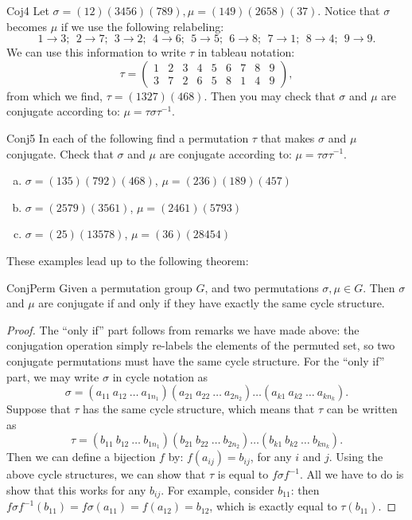 \begin{example}{Coj4}
Let $\sigma = (12)(3456)(789), \mu = (149)(2658)(37)$.  Notice that $\sigma$ becomes $\mu$ if we use the following relabeling:
$$ 1 \rightarrow 3;~~2 \rightarrow 7;~~3\rightarrow 2;~~4\rightarrow 6;~~5\rightarrow 5;~~6\rightarrow 8;~~7\rightarrow 1;~~8\rightarrow 4;~~9\rightarrow 9.$$
We can use this information to write $\tau$ in tableau notation:
$$ \tau =\begin{pmatrix} 1&2&3&4&5&6&7&8&9 \\ 3&7&2&6&5&8&1&4&9 \end{pmatrix}, $$
from which we find, $\tau=(1327)(468)$.  Then you may check that $\sigma$ and $\mu$ are conjugate according to: $\mu = \tau \sigma \tau^{-1}$.
\end{example}
\begin{exercise}{Conj5}
In each of the following find a permutation $\tau$ that makes $\sigma$ and $\mu$ conjugate.  Check that $\sigma$ and $\mu$ are conjugate according to: $\mu = \tau \sigma \tau^{-1}$.

\begin{enumerate}[(a)]
\item $\sigma=(135)(792)(468)$, $\mu=(236)(189)(457)$
\item $\sigma=(2579)(3561)$, $\mu=(2461)(5793)$
\item $\sigma=(25)(13578)$, $\mu=(36)(28454)$
\end{enumerate}
\end{exercise}
These examples lead up to the following theorem:

\begin{prop}{ConjPerm} Given a permutation group $G$, and two permutations $\sigma, \mu \in G$.  Then $\sigma$ and $\mu$ are conjugate if and only if they have exactly the same cycle structure.
\end{prop}
\begin{proof}
The ``only if'' part follows from remarks we have made above: the conjugation operation simply re-labels the elements of the permuted set, so two conjugate permutations must have the same cycle structure.
For the ``only if'' part, we may write $\sigma$ in cycle notation as
$$\sigma = (a_{11}~a_{12}~\ldots~a_{1n_1})(a_{21}~a_{22}~\ldots~a_{2n_2})  \ldots(a_{k1}~a_{k2}~\ldots~a_{k n_k}).$$  
Suppose that $\tau$ has the same cycle structure, which means that $\tau$ can be written as
$$\tau = (b_{11}~b_{12}~\ldots~b_{1n_1})(b_{21}~b_{22}~\ldots~b_{2n_2})  \ldots(b_{k1}~b_{k2}~\ldots~b_{k n_k}).$$
Then we can define a bijection $f$ by: $f(a_{ij}) = b_{ij}$, for any $i$ and $j$. Using the above cycle structures, we can show that $\tau$ is equal to $f \sigma f^{-1}$.  All we have to do is show that this works for any $ b_{ij}$.  For example, consider $b_{11}$: then $f \sigma f^{-1}( b_{11}) = f \sigma ( a_{11}) = f ( a_{12})= b_{12}$, which is exactly equal to $ \tau(b_{11})$.
\end{proof}


